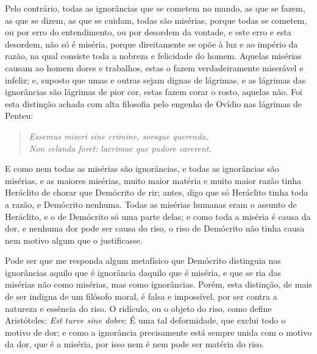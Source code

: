 Pelo contrário, todas as ignorâncias que se cometem no mundo, as que se
fazem, as que se dizem, as que se cuidam, todas são misérias, porque
todas se cometem, ou por erro do entendimento, ou por desordem da
vontade, e este erro e esta desordem, não só é miséria, porque
direitamente se opõe à luz e ao império da razão, na qual consiste toda
a nobreza e felicidade do homem. Aquelas misérias causam ao homem dores
e trabalhos, estas o fazem verdadeiramente miserável e infeliz; e,
suposto que umas e outras sejam dignas de lágrimas, e as lágrimas das
ignorâncias são lágrimas de pior cor, estas fazem corar o rosto, aquelas
não. Foi esta distinção achada com alta filosofia pelo engenho de Ovídio
nas lágrimas de Penteu:

\begin{verse}
\emph{Essemus miseri sine crimine, sorsque querenda,}\\
\emph{Non celanda foret: lacrimae que pudore carerent.}
\end{verse}

E como nem todas as misérias são ignorâncias, e todas as ignorâncias são
misérias, e as maiores misérias, muito maior matéria e muito maior razão
tinha Heráclito de chorar que Demócrito de rir; antes, digo que só
Heráclito tinha toda a razão, e Demócrito nenhuma. Todas as misérias
humanas eram o assunto de Heráclito, e o de Demócrito só uma parte
delas; e como toda a miséria é causa da dor, e nenhuma dor pode ser
causa do riso, o riso de Demócrito não tinha causa nem motivo algum que
o justificasse.

Pode ser que me responda algum metafísico que Demócrito distinguia nas
ignorâncias aquilo que é ignorância daquilo que é miséria, e que se ria
das misérias não como misérias, mas como ignorâncias. Porém, esta
distinção, de mais de ser indigna de um filósofo moral, é falsa e
impossível, por ser contra a natureza e essência do riso. O ridículo, ou
o objeto do riso, como define Aristóteles: \emph{Est turve sine dobre}:
É uma tal deformidade, que exclui todo o motivo de dor; e como a
ignorância precisamente está sempre unida com o motivo da dor, que é a
miséria, por isso nem é nem pode ser matéria do riso.


